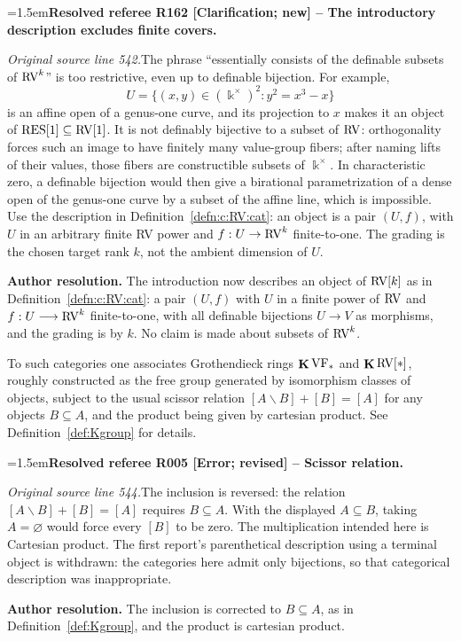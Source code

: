 \documentclass[12pt]{amsart}
\newcommand{\ResolvedRefereeRemark}[5]{%
  \par\medskip\begingroup\normalfont\small\color{gray}%
  \emergencystretch=1.5em\noindent\textbf{Resolved referee R#1 [#2] -- #3.}\par\nobreak\noindent #4\par
  \medskip\color{ResolutionGreen}\noindent\textbf{Author resolution.} #5\par
  \endgroup\medskip
}
\theoremstyle{plain}
\theoremstyle{definition}
\theoremstyle{remark}
\numberwithin{equation}{section}
\theoremstyle{plain}
\newcommand{\VF}{\textup{VF}}
\newcommand{\RV}{\textup{RV}}
\DeclareMathOperator{\K}{\mathds{k}}
\newcommand{\0}{\emptyset}
\newcommand{\fun}{\longrightarrow}
\newcommand{\sub}{\subseteq}
\newcommand{\mi}{\smallsetminus}
\newcommand{\RES}{\textup{RES}}
\DeclareMathOperator{\ggk}{\mathbf{K}}
\begin{document}
\ResolvedRefereeRemark{162}{Clarification; new}{The introductory description excludes finite covers}{%
\textit{Original source line 542.}\quad The phrase ``essentially consists of the definable subsets of $\RV^k$'' is too restrictive, even up to definable bijection. For example,
\[
U=\{(x,y)\in(\K^\times)^2:y^2=x^3-x\}
\]
is an affine open of a genus-one curve, and its projection to $x$ makes it an object of $\RES[1]\subseteq\RV[1]$. It is not definably bijective to a subset of $\RV$: orthogonality forces such an image to have finitely many value-group fibers; after naming lifts of their values, those fibers are constructible subsets of $\K^\times$. In characteristic zero, a definable bijection would then give a birational parametrization of a dense open of the genus-one curve by a subset of the affine line, which is impossible. Use the description in Definition~\ref{defn:c:RV:cat}: an object is a pair $(U,f)$, with $U$ in an arbitrary finite RV power and $f:U\to\RV^k$ finite-to-one. The grading is the chosen target rank $k$, not the ambient dimension of $U$.
}{The introduction now describes an object of $\RV[k]$ as in Definition~\ref{defn:c:RV:cat}: a pair $(U,f)$ with $U$ in a finite power of $\RV$ and $f : U \fun \RV^k$ finite-to-one, with all definable bijections $U \fun V$ as morphisms, and the grading is by $k$. No claim is made about subsets of $\RV^k$.}

To such categories one associates Grothendieck rings $\ggk\VF_*$ and $\ggk\RV[*]$, roughly constructed as the free group generated by isomorphism classes of objects, subject to the usual scissor relation $[A \mi B] + [B] = [A]$ for any objects $B \sub A$, and the product being given by cartesian product. See  Definition~\ref{def:Kgroup} for details.

\ResolvedRefereeRemark{005}{Error; revised}{Scissor relation}{%
\textit{Original source line 544.}\quad The inclusion is reversed: the relation $[A\mi B]+[B]=[A]$ requires $B\subseteq A$. With the displayed $A\subseteq B$, taking $A=\varnothing$ would force every $[B]$ to be zero. The multiplication intended here is Cartesian product. The first report's parenthetical description using a terminal object is withdrawn: the categories here admit only bijections, so that categorical description was inappropriate.
}{The inclusion is corrected to $B \sub A$, as in Definition~\ref{def:Kgroup}, and the product is cartesian product.}
\end{document}
